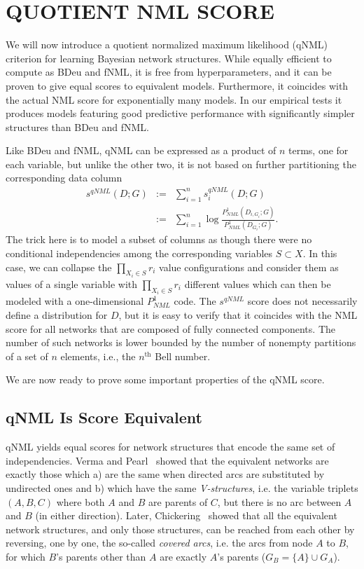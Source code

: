 \section{QUOTIENT NML SCORE}

We will now introduce a quotient normalized maximum likelihood (qNML)
criterion for learning Bayesian network structures.  While equally
efficient to compute as BDeu and fNML, it is free from
hyperparameters, and it can be proven to give equal scores to
equivalent models. Furthermore, it coincides with the actual NML score
for exponentially many models. In our empirical tests it produces
models featuring good predictive performance with significantly
simpler structures than BDeu and fNML.

Like BDeu and fNML, qNML can be expressed as a product of $n$ terms,
one for each variable, but unlike the other two, it is not based on
further partitioning the corresponding data column
\begin{eqnarray}
\label{eqn:qnmldef}
s^{qNML}(D;G) & := & \sum_{i=1}^n s^{qNML}_i(D;G)\\
& := & \sum_{i=1}^n \log \frac{P^1_{NML}(D_{i,G_i};G)}
                             {P^1_{NML}(D_{G_i};G)}.\nonumber
\end{eqnarray}
The trick here is to model a subset of columns as though there were no
conditional independencies among the corresponding variables $S
\subset X$.  In this case, we can collapse the $\prod_{X_i\in S} r_i$
value configurations and consider them as values of a single variable
with $\prod_{X_i\in S} r_i$ different values which can then be modeled
with a one-dimensional $P^1_{NML}$ code.  The $s^{qNML}$ score does
not necessarily define a distribution for $D$, but it is easy to
verify that it coincides with the NML score for all networks
that are composed of fully connected components.  The number of such
networks is lower bounded by the number of nonempty partitions of a
set of $n$ elements, i.e., the $n^\text{th}$ Bell number.

We are now ready to prove some important properties of the qNML score.

\subsection {qNML Is Score Equivalent}

qNML yields equal scores for network structures that encode the same set
of independencies. Verma and Pearl~\cite{Verm90} showed that the
equivalent networks are exactly those which a) are the same when directed
arcs are substituted by undirected ones and b) which have the same
\textit{V-structures}, i.e. the variable triplets $(A,B,C)$ where both
$A$ and $B$ are parents of $C$, but there is no arc between $A$ and
$B$ (in either direction).  Later, Chickering~\cite{Chick95} showed
that all the equivalent network structures, and only those structures,
can be reached from each other by reversing, one by one, the so-called
\textit{covered arcs}, i.e. the arcs from node $A$ to $B$, for which
$B$'s parents other than $A$ are exactly  $A$'s parents
($G_B=\{A\}\cup G_A$).

